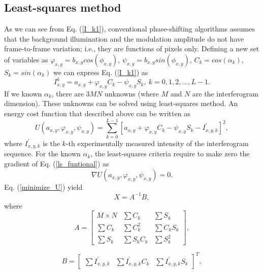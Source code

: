 \documentclass[letterpaper,12pt]{article}   %
\begin{document}
\subsection{Least-squares method}
As we can see from Eq. (\ref{I_k1}), conventional phase-shifting algorithms assumes that the background illumination and the modulation amplitude do not have frame-to-frame variation; i.e., they are functions of pixels only. Defining a new set of variables as $\varphi_{x,y}=b_{x,y}cos(\phi_{x,y})$, $\psi_{x,y}=b_{x,y}sin(\phi_{x,y})$, $C_k=cos(\alpha_k)$, $S_k=sin(\alpha_k)$ we can express Eq. (\ref{I_k1}) as
\begin{equation}\label{I_k2}
I_{x,y}^k=a_{x,y}+\varphi_{x,y}C_k-\psi_{x,y}S_k,\: k=0,1,2,...,L-1.
\end{equation}
If we known $\alpha_k$, there are $3MN$ unknowns (where $M$ and $N$ are the interferogram dimension). These unknowns can be solved using least-squares method. An energy cost function that described above can be written as
\begin{equation}\label{ls_funtional}
U(a_{x,y},\varphi_{x,y},\psi_{x,y})=\sum_{k=0}^{L-1} [a_{x,y}+\varphi_{x,y}C_k-\psi_{x,y}S_k-I_{x,y,k}^{'}]^2,
\end{equation}
where $I_{x,y,k}^{'}$ is the $k$-th experimentally measured intensity of the interferogram sequence. For the known $\alpha_k$, the least-squares criteria require to make zero the gradient of Eq. (\ref{ls_funtional}) as
\begin{equation}\label{minimize_U}
\nabla U(a_{x,y},\varphi_{x,y},\psi_{x,y})=0.
\end{equation}
Eq. (\ref{minimize_U}) yield
\begin{equation}\label{x=AB}
X = A^{-1} B,
\end{equation}
where
\begin{equation}\label{A}
A = \left[ \begin{array}{ccc}
M\times N & \sum C_k     & \sum S_k \\
\sum C_k  & \sum C_k^2   & \sum C_k S_k \\
\sum S_k  & \sum S_k C_k & \sum S_k^2\end{array} \right],
\end{equation}

\begin{equation}\label{B}
B = \left[ \begin{array}{ccc}
\sum I_{x,y,k}^{'} & \sum I_{x,y,k}^{'} C_k & \sum I_{x,y,k}^{'} S_k \end{array} \right]^T,
\end{equation}
\end{document}
